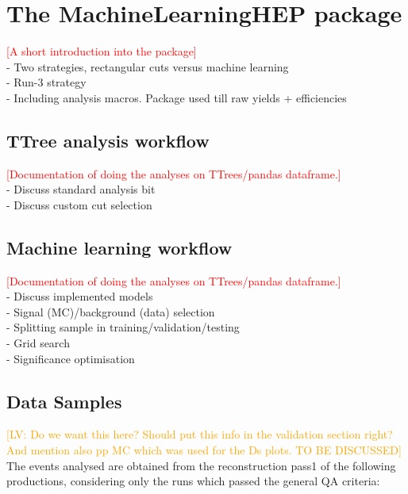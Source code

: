 \section{The MachineLearningHEP package}
\label{sec:MLHEPpackage}

\textcolor{red}{[A short introduction into the package]}  \\
- Two strategies, rectangular cuts versus machine learning \\
- Run-3 strategy \\
- Including analysis macros. Package used till raw yields + efficiencies \\

\subsection{TTree analysis workflow}

\textcolor{red}{[Documentation of doing the analyses on TTrees/pandas dataframe.]} \\
- Discuss standard analysis bit \\
- Discuss custom cut selection \\

\subsection{Machine learning workflow}

\textcolor{red}{[Documentation of doing the analyses on TTrees/pandas dataframe.]} \\
- Discuss implemented models \\
- Signal (MC)/background (data) selection \\
- Splitting sample in training/validation/testing \\
- Grid search \\
- Significance optimisation \\

\subsection{Data Samples}

\textcolor{orange}{[LV: Do we want this here? Should put this info in the validation section right? And mention also pp MC which was used for the Ds plots. TO BE DISCUSSED]} \\

The events analysed are obtained from the reconstruction pass1 of the following productions, considering only the runs which passed the general QA criteria:\\

